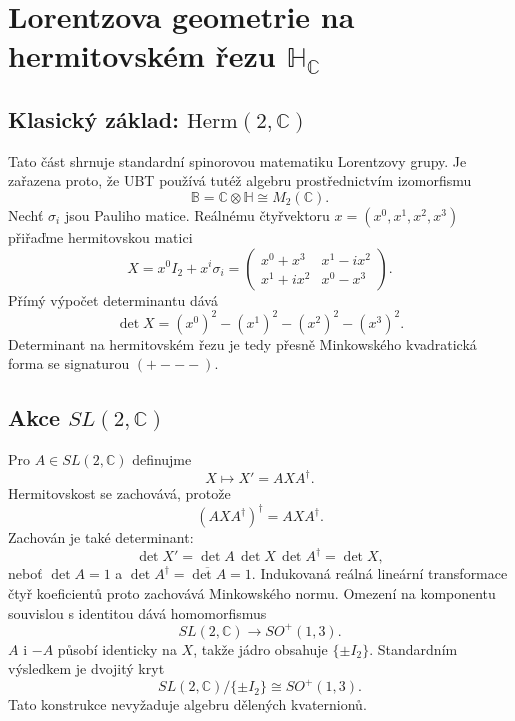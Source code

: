 
\chapter{Lorentzova geometrie na hermitovském řezu \(\mathbb H_{\mathbb C}\)}
\label{ch:lorentz-hc}

\section{Klasický základ: \(\mathrm{Herm}(2,\mathbb C)\)}
Tato část shrnuje standardní spinorovou matematiku Lorentzovy grupy. Je
zařazena proto, že UBT používá tutéž algebru prostřednictvím izomorfismu
\[
 \mathbb B=\mathbb C\otimes\mathbb H\cong M_2(\mathbb C).
\]
Nechť $\sigma_i$ jsou Pauliho matice. Reálnému čtyřvektoru
$x=(x^0,x^1,x^2,x^3)$ přiřaďme hermitovskou matici
\[
 X=x^0 I_2+x^i\sigma_i
 =\begin{pmatrix}
 x^0+x^3 & x^1-i x^2\\
 x^1+i x^2 & x^0-x^3
 \end{pmatrix}.
\]
Přímý výpočet determinantu dává
\[
 \boxed{\det X=(x^0)^2-(x^1)^2-(x^2)^2-(x^3)^2.}
\]
Determinant na hermitovském řezu je tedy přesně Minkowského kvadratická forma
se signaturou $(+---)$.

\section{Akce \(SL(2,\mathbb C)\)}
Pro $A\in SL(2,\mathbb C)$ definujme
\[
 X\longmapsto X'=A X A^\dagger .
\]
Hermitovskost se zachovává, protože
\[
 (A X A^\dagger)^\dagger=A X A^\dagger.
\]
Zachován je také determinant:
\[
 \det X'=\det A\,\det X\,\det A^\dagger
 =\det X,
\]
neboť $\det A=1$ a $\det A^\dagger=\overline{\det A}=1$.
Indukovaná reálná lineární transformace čtyř koeficientů proto zachovává
Minkowského normu. Omezení na komponentu souvislou s identitou dává
homomorfismus
\[
 SL(2,\mathbb C)\longrightarrow SO^+(1,3).
\]
$A$ i $-A$ působí identicky na $X$, takže jádro obsahuje
$\{\pm I_2\}$.  Standardním výsledkem je dvojitý kryt
\[
 \boxed{SL(2,\mathbb C)/\{\pm I_2\}\cong SO^+(1,3).}
\]
Tato konstrukce nevyžaduje algebru dělených kvaternionů.

